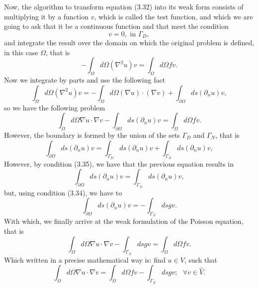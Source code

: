 Now, the algorithm to transform equation (3.32) into its weak form consists of multiplying it by a function $v$, which is called the test function, and which we are going to ask that it be a continuous function and that meet the condition
\begin{equation}
     v = 0, \text{ in } \Gamma_D,
\end{equation}
and integrate the result over the domain on which the original problem is defined, in this case $\Omega$, that is
\begin{equation}
     -\int_{\Omega}d\Omega(\nabla^2u) v = \int_{\Omega}d\Omega fv.
\end{equation}
Now we integrate by parts and use the following fact
\begin{equation}
     \int_{\Omega}d\Omega (\nabla^2u)v = -\int_{\Omega}d\Omega(\nabla u)\cdot (\nabla v) + \int_{\partial\Omega}ds( \partial_nu)v,
\end{equation}
so we have the following problem
\begin{equation}
     \int_{\Omega}d\Omega\nabla u\cdot \nabla v - \int_{\partial\Omega}ds(\partial_nu)v = \int_{\Omega}d\Omega fv.
\end{equation}
However, the boundary is formed by the union of the sets $\Gamma_D$ and $\Gamma_N$, that is
\begin{equation}
     \int_{\partial\Omega}ds(\partial_nu)v = \int_{\Gamma_D}ds(\partial_nu)v + \int_{\Gamma_N}ds(\partial_nu)v,
\end{equation}
However, by condition (3.35), we have that the previous equation results in
\begin{equation}
     \int_{\partial\Omega}ds(\partial_nu)v = \int_{\Gamma_N}ds(\partial_nu)v,
\end{equation}
but, using condition (3.34), we have to
\begin{equation}
     \int_{\partial\Omega}ds(\partial_nu)v = -\int_{\Gamma_N}dsgv.
\end{equation}
With which, we finally arrive at the weak formulation of the Poisson equation, that is
\begin{equation}
     \int_{\Omega}d\Omega\nabla u\cdot \nabla v - \int_{\Gamma_N}dsgv = \int_{\Omega}d\Omega fv.
\end{equation}
Which written in a precise mathematical way is: find $u\in V$, such that
\begin{equation}
     \int_{\Omega}d\Omega\nabla u\cdot \nabla v= \int_{\Omega}d\Omega fv - \int_{\Gamma_N}dsgv ; \ \ \ \forall v\in \hat{V}.
\end{equation}

